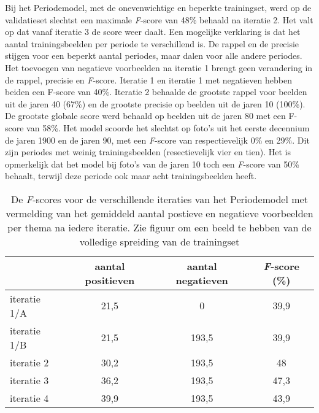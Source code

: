 Bij het Periodemodel, met de onevenwichtige en beperkte trainingset, werd op de validatieset slechtst een maximale \textit{F}-score van 48\% behaald na iteratie 2. Het valt op dat vanaf iteratie 3 de score weer daalt. Een mogelijke verklaring is dat het aantal trainingsbeelden per periode te verschillend is. De rappel en de precisie stijgen voor een beperkt aantal periodes, maar dalen voor alle andere periodes. Het toevoegen van negatieve voorbeelden na iteratie 1 brengt geen verandering in de rappel, precisie en \textit{F}-score. Iteratie 1 en iteratie 1 met negatieven hebben beiden een F-score van 40\%. Iteratie 2 behaalde de grootste rappel voor beelden uit de jaren 40 (67\%) en de grootste precisie op beelden uit de jaren 10 (100\%). De grootste globale score werd behaald op beelden uit de jaren 80 met een F-score van 58\%. Het model scoorde het slechtst op foto’s uit het eerste decennium de jaren 1900 en de jaren 90, met een \textit{F}-score van respectievelijk 0\% en 29\%. Dit zijn periodes met weinig trainingsbeelden (resectievelijk vier en tien). Het is opmerkelijk dat het model bij foto's van de jaren 10 toch een \textit{F}-score van 50\% behaalt, terwijl deze periode ook maar acht trainingsbeelden heeft.

\begin{table}
	\centering
	\renewcommand\arraystretch{1.2}
	\begin{tabular}{l|cc|c}
		\toprule
		& aantal positieven  &  aantal negatieven &  \textit{F}-score (\%)\\
		\midrule
		iteratie 1/A & 21,5 & 0 & 39,9 \\
		iteratie 1/B & 21,5 & 193,5 & 39,9 \\
		iteratie 2 & 30,2 & 193,5 & 48 \\
		iteratie 3 & 36,2 & 193,5 & 47,3 \\
		iteratie 4 & 39,9 & 193,5 & 43,9 \\
		\bottomrule
	\end{tabular}
	\caption[De \textit{F}-scores voor de verschillende iteraties van het Periodemodel.]{De \textit{F}-scores voor de verschillende iteraties van het Periodemodel met vermelding van het gemiddeld aantal postieve en negatieve voorbeelden per thema na iedere iteratie. Zie figuur om een beeld te hebben van de volledige spreiding van de trainingset}
	\label{tab:validatie-periodemodel}
\end{table}

